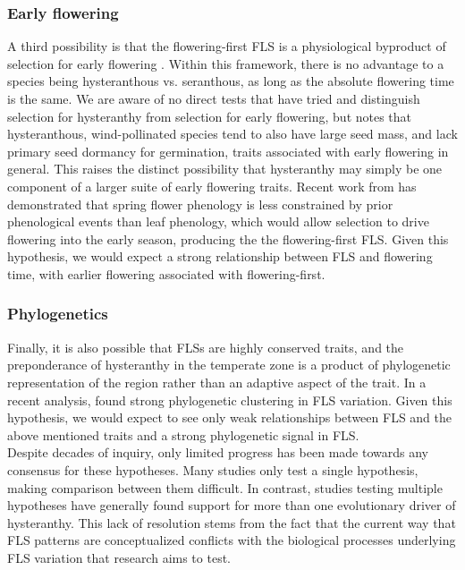 \documentclass{article}
\begin{document}
\subsubsection*{Early flowering}
\indent\indent A third possibility is that the flowering-first FLS is a physiological byproduct of selection for early flowering \citep{Primack1987}. Within this framework, there is no advantage to a species being hysteranthous vs. seranthous, as long as the absolute flowering time is the same. We are aware of no direct tests that have tried and distinguish selection for hysteranthy from selection for early flowering, but \citet{Primack1987} notes that hysteranthous, wind-pollinated species tend to also have large seed mass, and lack primary seed dormancy for germination, traits associated with early flowering in general. This raises the distinct possibility that hysteranthy may simply be one component of a larger suite of early flowering traits. Recent work from \citet{Savage2019} has demonstrated that spring flower phenology is less constrained by prior phenological events than leaf phenology, which would allow selection to drive flowering into the early season, producing the the flowering-first FLS. Given this hypothesis, we would expect a strong relationship between FLS and flowering time, with earlier flowering associated with flowering-first.
\subsubsection*{Phylogenetics} 
\indent\indent Finally, it is also possible that FLSs are highly conserved traits, and the preponderance of hysteranthy in the temperate zone is a product of phylogenetic representation of the region rather than an adaptive aspect of the trait. In a recent analysis, \citet{Gougherty2018} found strong phylogenetic clustering in FLS variation. Given this hypothesis, we would expect to see only weak relationships between FLS and the above mentioned traits and a strong phylogenetic signal in FLS.\\

Despite decades of inquiry, only limited progress has been made towards any consensus for these hypotheses. Many studies only test a single hypothesis, making comparison between them difficult. In contrast, studies testing multiple hypotheses have generally found support for more than one evolutionary driver of hysteranthy\citep[see][]{Bolmgren2003,Gougherty2018}. This lack of resolution stems from the fact that the current way that FLS patterns are conceptualized conflicts with the biological processes underlying FLS variation that research aims to test.
\end{document}
